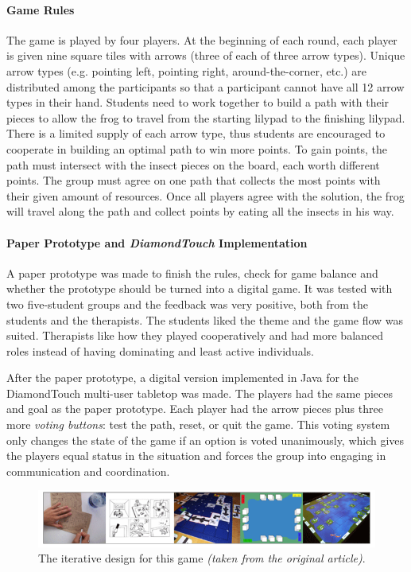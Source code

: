 \documentclass[runningheads]{llncs}
\begin{document}
\paragraph{Game Rules} The game is played by four players. At the beginning of each round, each player is given nine square tiles with arrows (three of each of three arrow types). Unique arrow types (e.g. pointing left, pointing right, around-the-corner, etc.) are distributed among the participants so that a participant cannot have all 12 arrow types in their hand. Students need to work together to build a path with their pieces to allow the frog to travel from the starting lilypad to the finishing lilypad. There is a limited supply of each arrow type, thus students are encouraged to cooperate in building an optimal path to win more points. To gain points, the path must intersect with the insect pieces on the board, each worth different points. The group must agree on one path that collects the most points with their given amount of resources. Once all players agree with the solution, the frog will travel along the path and collect points by eating all the insects in his way.

\paragraph{Paper Prototype and \textit{DiamondTouch} Implementation} A paper prototype was made to finish the rules, check for game balance and whether the prototype should be turned into a digital game. It was tested with two five-student groups and the feedback was very positive, both from the students and the therapists. The students liked the theme and the game flow was suited. Therapists like how they played cooperatively and had more balanced roles instead of having dominating and least active individuals.
\par After the paper prototype, a digital version implemented in Java for the DiamondTouch multi-user tabletop was made. The players had the same pieces and goal as the paper prototype. Each player had the arrow pieces plus three more \textit{voting buttons}: test the path, reset, or quit the game. This voting system only changes the state of the game if an option is voted unanimously, which gives the players equal status in the situation and forces the group into engaging in communication and coordination.

\begin{figure}
    \centering
    \includegraphics[scale = 0.55]{SIDES.png}
    \caption{The iterative design for this game \textit{(taken from the original article)}.}
    \label{fig:SIDES}
\end{figure}
\end{document}

